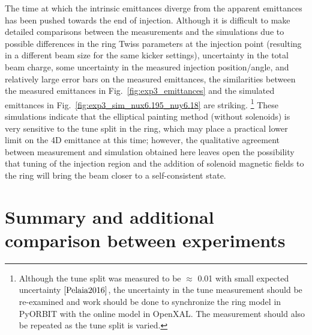 The time at which the intrinsic emittances diverge from the apparent emittances has been pushed towards the end of injection. Although it is difficult to make detailed comparisons between the measurements and the simulations due to possible differences in the ring Twiss parameters at the injection point (resulting in a different beam size for the same kicker settings), uncertainty in the total beam charge, some uncertainty in the measured injection position/angle, and relatively large error bars on the measured emittances, the similarities between the measured emittances in Fig.~\ref{fig:exp3_emittances} and the simulated emittances in Fig.~\ref{fig:exp3_sim_nux6.195_nuy6.18} are striking. \footnote{Although the tune split was measured to be $\approx$ 0.01 with small expected uncertainty $\cite{Pelaia2016}$, the uncertainty in the tune measurement should be re-examined and work should be done to synchronize the ring model in PyORBIT with the online model in OpenXAL. The measurement should also be repeated as the tune split is varied.} These simulations indicate that the elliptical painting method (without solenoids) is very sensitive to the tune split in the ring, which may place a practical lower limit on the 4D emittance at this time; however, the qualitative agreement between measurement and simulation obtained here leaves open the possibility that tuning of the injection region and the addition of solenoid magnetic fields to the ring will bring the beam closer to a self-consistent state.



\section{Summary and additional comparison between experiments}

